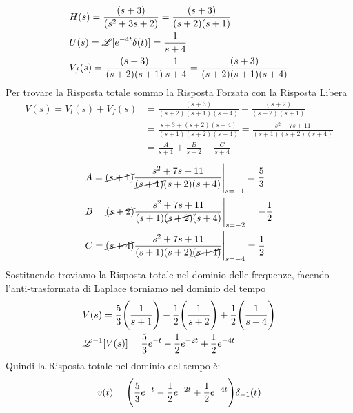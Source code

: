 		\[
		\begin{split}
		&H(s)=\frac{(s+3)}{(s^2+3s+2)}= \frac{(s+3)}{(s+2)(s+1)}\\
		&U(s)=\mathscr{L}[e^{-4t}\delta(t)]=\frac{1}{s+4}\\
		&V_f(s)=\frac{(s+3)}{(s+2)(s+1)}\frac{1}{s+4}=\frac{(s+3)}{(s+2)(s+1)(s+4)}
		\end{split}
		\]
		Per trovare la Risposta totale sommo la Risposta Forzata con la Risposta Libera
		\[
		\begin{split}
		V(s)=V_l(s)+V_f(s)
		&=\frac{(s+3)}{(s+2)(s+1)(s+4)} + \frac{(s+2)}{(s+2)(s+1)}\\
		&=\frac{s+3+(s+2)(s+4)}{(s+1)(s+2)(s+4)}
		=\frac{s^2+7s+11}{(s+1)(s+2)(s+4)}\\
		&=\frac{A}{s+1}+\frac{B}{s+2}+\frac{C}{s+4}
		\end{split}
		\]
		\[
		\begin{split}
		&A=\cancel{(s+1)}\frac{s^2+7s+11}{\cancel{(s+1)}(s+2)(s+4)}\Bigg|_{s=-1}=\frac{5}{3}\\
		&B=\cancel{(s+2)}\frac{s^2+7s+11}{(s+1)\cancel{(s+2)}(s+4)}\Bigg|_{s=-2}=-\frac{1}{2}\\
		&C=\cancel{(s+4)}\frac{s^2+7s+11}{(s+1)(s+2)\cancel{(s+4)}}\Bigg|_{s=-4}=\frac{1}{2}
		\end{split}
		\]
		Sostituendo troviamo la Risposta totale nel dominio delle frequenze, facendo l'anti-trasformata di Laplace torniamo nel dominio del tempo
		\[
		\begin{split}
		&V(s)=\frac{5}{3}\Bigg(\frac{1}{s+1}\Bigg)-\frac{1}{2}\Bigg(\frac{1}{s+2}\Bigg)+\frac{1}{2}\Bigg(\frac{1}{s+4}\Bigg)\\
		&\mathscr{L}^{-1}[V(s)]=\frac{5}{3}e^{-t}-\frac{1}{2}e^{-2t}+\frac{1}{2}e^{-4t}
		\end{split}
		\]
		Quindi la Risposta totale nel dominio del tempo è:
		\[
		v(t)=\Bigg(\frac{5}{3}e^{-t}-\frac{1}{2}e^{-2t}+\frac{1}{2}e^{-4t}\Bigg)\delta_{-1}(t)
		\]
		\newpage
%